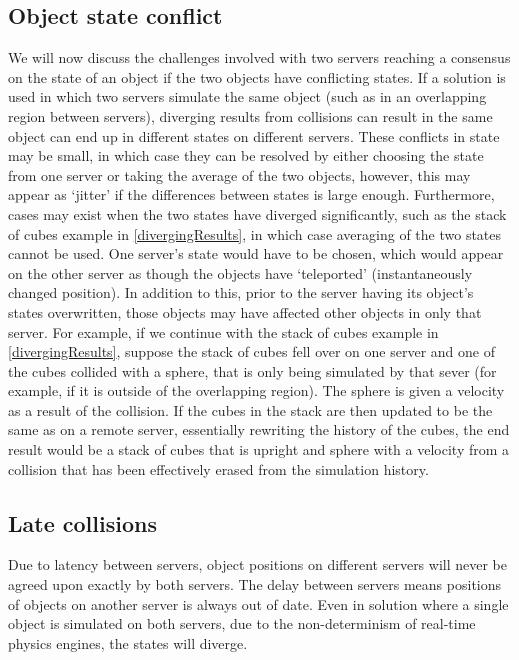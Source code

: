 \subsection{Object state conflict}
We will now discuss the challenges involved with two servers reaching a consensus on the state of an object if the two objects have conflicting states. If a solution is used in which two servers simulate the same object (such as in an overlapping region between servers), diverging results from collisions can result in the same object can end up in different states on different servers. These conflicts in state may be small, in which case they can be resolved by either choosing the state from one server or taking the average of the two objects, however, this may appear as `jitter' if the differences between states is large enough. Furthermore, cases may exist when the two states have diverged significantly, such as the stack of cubes example in \ref{divergingResults}, in which case averaging of the two states cannot be used. One server's state would have to be chosen, which would appear on the other server as though the objects have `teleported' (instantaneously changed position). In addition to this, prior to the server having its object's states overwritten, those objects may have affected other objects in only that server. For example, if we continue with the stack of cubes example in \ref{divergingResults}, suppose the stack of cubes fell over on one server and one of the cubes collided with a sphere, that is only being simulated by that sever (for example, if it is outside of the overlapping region). The sphere is given a velocity as a result of the collision. If the cubes in the stack are then updated to be the same as on a remote server, essentially rewriting the history of the cubes, the end result would be a stack of cubes that is upright and sphere with a velocity from a collision that has been effectively erased from the simulation history.

\subsection{Late collisions}\label{lateCollisions}
Due to latency between servers, object positions on different servers will never be agreed upon exactly by both servers. The delay between servers means positions of objects on another server is always out of date. Even in solution where a single object is simulated on both servers, due to the non-determinism of real-time physics engines, the states will diverge. 

